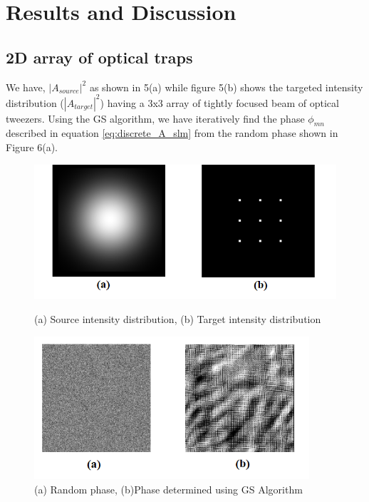 \section{Results and Discussion} 
\label{sec:results}
\subsection{2D array of optical traps}
We have, $|A_{source}|^2$ as shown in 5(a) while figure 5(b) shows the targeted intensity distribution ($ |A_{target}|^2 $) having a 3x3 array of tightly focused beam of optical tweezers. Using the GS algorithm, we have iteratively find the phase $\phi_{mn}$ described in equation \ref{eq:discrete_A_slm} from the random phase shown in Figure 6(a).
\begin{figure}[H]
\centering
\includegraphics[width=\textwidth]{img/Target.png}
\label{fig:img_target}
\caption{(a) Source intensity distribution, (b) Target intensity distribution}
\end{figure}

\begin{figure}[H]
\label{fig:phase}
\centering
\includegraphics[width=0.91\textwidth]{img/Phase.png}
\caption{(a) Random phase, (b)Phase determined using GS Algorithm}
\end{figure}

